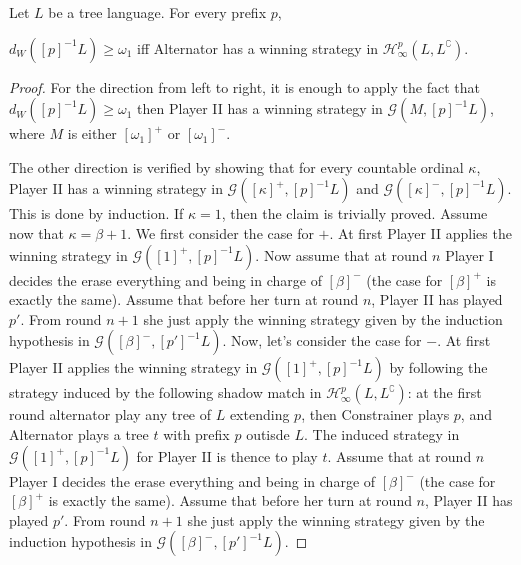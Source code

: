 \begin{proposition}\label{prop:infinity} Let $L$ be a tree language. For every prefix $p$,

$d_W([p]^{-1}L) \geq \omega_1$ iff Alternator has a winning strategy in $\mathcal{H}^p_\infty(L, L^\complement)$. 

\end{proposition}
\begin{proof}
For the direction from left to right, it is enough to apply the fact that $d_W([p]^{-1}L) \geq \omega_1$ then Player II has a winning strategy in $\mathcal{G}(M, [p]^{-1}L)$, where $M$ is either $[\omega_1]^+$ or $[\omega_1]^-$. 
%


The other direction is verified by showing that for every countable ordinal $\kappa$, Player II has a winning strategy in $\mathcal{G}([\kappa]^+, [p]^{-1}L)$ and $\mathcal{G}([\kappa]^-, [p]^{-1}L)$.
This is done by induction. %
If $\kappa=1$, then the claim is trivially proved.
Assume now that $\kappa= \beta + 1$. We first consider the case for $+$. At first Player II applies the winning strategy in $\mathcal{G}([1]^+, [p]^{-1}L)$. Now assume that at round $n$ Player I decides the erase everything and being in charge of $[\beta]^-$ (the case for $[\beta]^+$ is exactly the same). Assume that before her turn at round $n$, Player II has played $p'$. From round $n+1$ she just apply the winning strategy given by the induction hypothesis in $\mathcal{G}([\beta]^-, [p']^{-1}L)$. Now, let's consider the case for $-$. At first Player II applies the winning strategy in $\mathcal{G}([1]^+, [p]^{-1}L)$ by following the strategy induced by the following shadow match in $\mathcal{H}^p_\infty(L, L^\complement)$: at the first round alternator play any tree of $L$ extending $p$, then Constrainer plays $p$, and Alternator plays a tree $t$ with prefix $p$ outisde $L$. The induced strategy in $\mathcal{G}([1]^+, [p]^{-1}L)$ for Player II is thence to play $t$. 
Assume that at round $n$ Player I decides the erase everything and being in charge of $[\beta]^-$ (the case for $[\beta]^+$ is exactly the same). Assume that before her turn at round $n$, Player II has played $p'$. From round $n+1$ she just apply the winning strategy given by the induction hypothesis in $\mathcal{G}([\beta]^-, [p']^{-1}L)$.
\end{proof}


